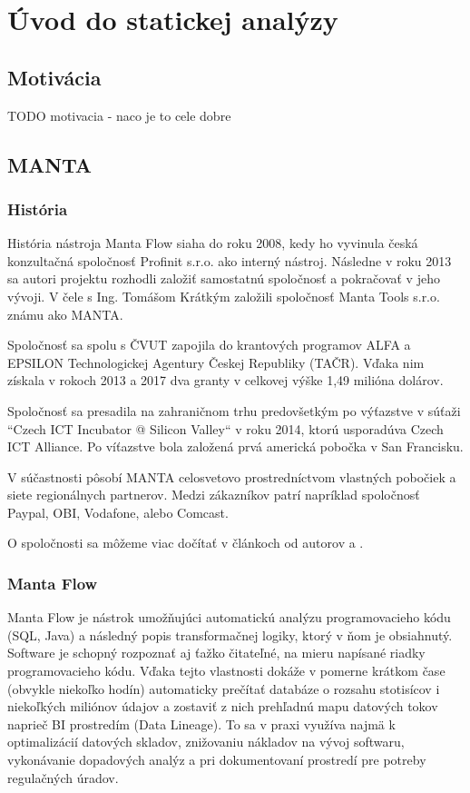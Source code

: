 
\chapter{Úvod do statickej analýzy}

\section{Motivácia}

TODO motivacia - naco je to cele dobre

\section{MANTA}

\subsection{História}

História nástroja Manta Flow siaha do roku 2008, kedy ho vyvinula česká konzultačná spoločnosť Profinit s.r.o. ako interný nástroj.
Následne v roku 2013 sa autori projektu rozhodli založiť samostatnú spoločnosť a pokračovať v jeho vývoji.
V čele s Ing. Tomášom Krátkým založili spoločnosť Manta Tools s.r.o. známu ako MANTA.

Spoločnosť sa spolu s ČVUT zapojila do krantových programov ALFA a EPSILON Technologickej Agentury Českej Republiky (TAČR).
Vďaka nim získala v rokoch 2013 a 2017 dva granty v celkovej výške 1,49 milióna dolárov.

Spoločnosť sa presadila na zahraničnom trhu predovšetkým po výťazstve v súťaži ``Czech ICT Incubator @ Silicon Valley`` v roku 2014,
ktorú usporadúva Czech ICT Alliance. Po víťazstve bola založená prvá americká pobočka v San Francisku.

V súčastnosti pôsobí MANTA celosvetovo prostredníctvom vlastných pobočiek a siete regionálnych partnerov.
Medzi zákazníkov patrí napríklad spoločnosť Paypal, OBI, Vodafone, alebo Comcast.

O spoločnosti sa môžeme viac dočítať v článkoch od autorov \citet{MANTA} a \citet{MANTA_HISTORIA}.

\subsection{Manta Flow}

Manta Flow je nástrok umožňujúci automatickú analýzu programovacieho kódu (SQL, Java) a následný popis transformačnej logiky,
ktorý v ňom je obsiahnutý. Software je schopný rozpoznať aj ťažko čitateľné, na mieru napísané riadky programovacieho kódu.
Vďaka tejto vlastnosti dokáže v pomerne krátkom čase (obvykle niekoľko hodín) automaticky prečítať databáze o rozsahu
stotisícov i niekoľkých miliónov údajov a zostaviť z nich prehľadnú mapu datových tokov naprieč BI prostredím (Data Lineage).
To sa v praxi využíva najmä k optimalizácií datových skladov, znižovaniu nákladov na vývoj softwaru, vykonávanie dopadových
analýz a pri dokumentovaní prostredí pre potreby regulačných úradov.

